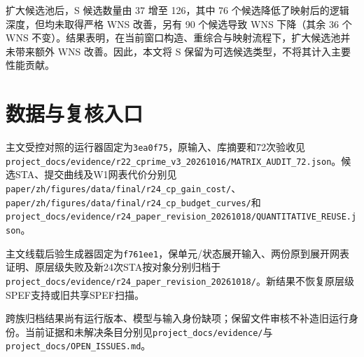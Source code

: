 \documentclass[twocolumn,10pt,fontset=windows]{ctexart}
\begin{document}
扩大候选池后，S 候选数量由 37 增至 126，其中 76 个候选降低了映射后的逻辑深度，但均未取得严格 WNS 改善，另有 90 个候选导致 WNS 下降（其余 36 个 WNS 不变）。结果表明，在当前窗口构造、重综合与映射流程下，扩大候选池并未带来额外 WNS 改善。因此，本文将 S 保留为可选候选类型，不将其计入主要性能贡献。

\section{数据与复核入口}

主文受控对照的运行器固定为\texttt{3ea0f75}，原输入、库摘要和72次验收见\nolinkurl{project_docs/evidence/r22_cprime_v3_20261016/MATRIX_AUDIT_72.json}。候选STA、提交曲线及W1网表代价分别见\nolinkurl{paper/zh/figures/data/final/r24_cp_gain_cost/}、\nolinkurl{paper/zh/figures/data/final/r24_cp_budget_curves/}和\nolinkurl{project_docs/evidence/r24_paper_revision_20261018/QUANTITATIVE_REUSE.json}。

主文线载后验生成器固定为\texttt{f761ee1}，保单元/状态展开输入、两份原到展开网表证明、原层级失败及新24次STA按对象分别归档于\nolinkurl{project_docs/evidence/r24_paper_revision_20261018/}。新结果不恢复原层级SPEF支持或旧共享SPEF扫描。

跨族归档结果尚有运行版本、模型与输入身份缺项；保留文件审核不补造旧运行身份。当前证据和未解决条目分别见\nolinkurl{project_docs/evidence/}与\nolinkurl{project_docs/OPEN_ISSUES.md}。
\end{document}
